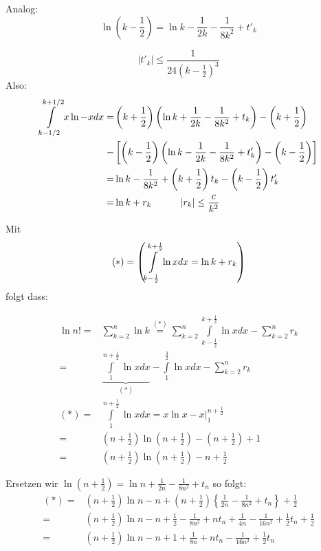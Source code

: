 \noindent Analog:
\[\ln \left( {k - \frac{1}{2}} \right) = \ln k - \frac{1}{{2k}} - \frac{1}{{8{k^2}}} + {t'_k}\]

\[\left| {{t'_k}} \right| \le \frac{1}{{24{\left(k-\frac{1}{2}\right)^3}}}\]
Also:
\begin{align*}
\int\limits_{k - 1/2}^{k + 1/2} x\ln  - xdx =& \left( {k + \frac{1}{2}} \right)\left( {\ln k + \frac{1}{{2k}} - \frac{1}{{8{k^2}}} + {t_k}} \right) - \left( {k + \frac{1}{2}} \right)\\
-&\left[ {\left( {k - \frac{1}{2}} \right)\left( {\ln k - \frac{1}{2k} - \frac{1}{8{k^2}} + t{'_k}} \right) - \left( {k - \frac{1}{2}} \right)} \right]\\
=&\ln k - \frac{1}{8{k^2}} + \left( {k + \frac{1}{2}} \right){t_k} - \left( {k - \frac{1}{2}} \right)t{'_k}\\
=&\ln k + {r_k}\hspace{10mm}\left| {r_k} \right| \le \frac{c}{k^2}
\end{align*}

\noindent Mit
\[(\text{\textasteriskcentered}) = \left( {\int\limits_{k - \frac{1}{2}}^{k + \frac{1}{2}} {\ln xdx = \ln k + {r_k}} } \right)\]
\noindent folgt dass:

\begin{align*}
\ln n! =&\sum\limits_{k = 2}^n {\ln k\mathop {{\text{  }} = }\limits^{(*)} \sum\limits_{k = 2}^n {\int\limits_{k - \frac{1}{2}}^{k + \frac{1}{2}} {\ln xdx} }  - \sum\limits_{k = 2}^n {{r_k}} } \\
 =&\underbrace {\int\limits_1^{n + \frac{1}{2}} {\ln xdx} }_{( * )} - \int\limits_1^{\frac{3}{2}} {\ln xdx - \sum\limits_{k = 2}^n {{r_k}} } \\
( * ) =&\int\limits_1^{n + \frac{1}{2}} {\ln xdx = \left. {x\ln x - x} \right|_1^{n + \frac{1}{2}}}\\ 
 =&\left( {n + \frac{1}{2}} \right)\ln \left( {n + \frac{1}{2}} \right) - \left( {n + \frac{1}{2}} \right) + 1\\
 =&\left( {n + \frac{1}{2}} \right)\ln \left( {n + \frac{1}{2}} \right) - n + \frac{1}{2}
\end{align*}

Ersetzen wir $\ln \left( {n + \frac{1}{2}} \right) = \ln n + \frac{1}{{2n}} - \frac{1}{{8{n^2}}} + {t_n}$ so folgt:
\begin{align*}
(*) =&\left( {n + \frac{1}{2}} \right)\ln n - n + \left( {n + \frac{1}{2}} \right)\left\{ {\frac{1}{{2n}} - \frac{1}{{8{n^2}}} + {t_n}} \right\} + \frac{1}{2}\\
 =&\left( {n + \frac{1}{2}} \right)\ln n - n + \frac{1}{2} - \frac{1}{{8{n^2}}} + n{t_n} + \frac{1}{{4n}} - \frac{1}{{16{n^2}}} + \frac{1}{2}{t_n} + \frac{1}{2}\\
 =&\left( {n + \frac{1}{2}} \right)\ln n - n + 1 + \frac{1}{{8n}} + n{t_n} - \frac{1}{{16{n^2}}} + \frac{1}{2}{t_n}
\end{align*}

